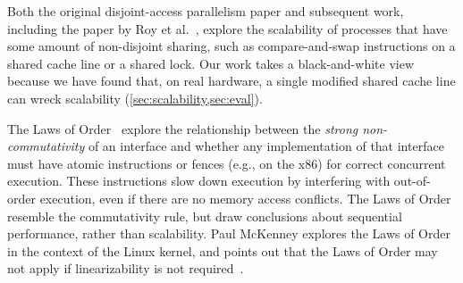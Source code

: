 


Both the original disjoint-access parallelism paper and subsequent work,
including the paper by Roy et al.~\cite{roy:limits-dap}, explore the scalability
of processes that have some amount of non-disjoint sharing, such as
compare-and-swap instructions on a shared cache line or a shared lock.
Our work takes a black-and-white view because we have found that, on real
hardware, a single modified
shared cache line can wreck
scalability (\cref{sec:scalability,sec:eval}).

The Laws of Order~\cite{law:orders} explore the relationship between
the \emph{strong non-commutativity} of an interface and whether any
implementation of that interface
must have atomic instructions or fences (e.g.,  on the x86) for
correct concurrent execution.  These instructions slow down execution by
interfering with out-of-order execution, even if there are no memory access
conflicts.  The Laws of Order resemble the commutativity rule, but draw
conclusions about sequential performance, rather than scalability.
%
Paul McKenney
explores the Laws of Order in the context of the Linux kernel, and points out
that the Laws of Order may not apply if linearizability is not
required~\cite{lwn:law}.


